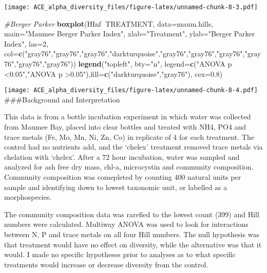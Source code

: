 \documentclass[]{article}
\newenvironment{Shaded}{\begin{snugshade}}{\end{snugshade}}
\newcommand{\KeywordTok}[1]{\textcolor[rgb]{0.13,0.29,0.53}{\textbf{#1}}}
\newcommand{\DataTypeTok}[1]{\textcolor[rgb]{0.13,0.29,0.53}{#1}}
\newcommand{\DecValTok}[1]{\textcolor[rgb]{0.00,0.00,0.81}{#1}}
\newcommand{\FloatTok}[1]{\textcolor[rgb]{0.00,0.00,0.81}{#1}}
\newcommand{\StringTok}[1]{\textcolor[rgb]{0.31,0.60,0.02}{#1}}
\newcommand{\CommentTok}[1]{\textcolor[rgb]{0.56,0.35,0.01}{\textit{#1}}}
\newcommand{\OperatorTok}[1]{\textcolor[rgb]{0.81,0.36,0.00}{\textbf{#1}}}
\newcommand{\NormalTok}[1]{#1}
\begin{document}
\texttt{[image: ACE\_alpha\_diversity\_files/figure-latex/unnamed-chunk-8-3.pdf]}

\begin{Shaded}
\begin{Highlighting}[]
\CommentTok{#Berger Parker}
\KeywordTok{boxplot}\NormalTok{(HInf}\OperatorTok{~}\NormalTok{TREATMENT, }\DataTypeTok{data=}\NormalTok{maum.hills,}
        \DataTypeTok{main=}\StringTok{"Maumee Berger Parker Index"}\NormalTok{,}
        \DataTypeTok{xlab=}\StringTok{"Treatment"}\NormalTok{,}
        \DataTypeTok{ylab=}\StringTok{"Berger Parker Index"}\NormalTok{,}
        \DataTypeTok{las=}\DecValTok{2}\NormalTok{,}
        \DataTypeTok{col=}\KeywordTok{c}\NormalTok{(}\StringTok{"gray76"}\NormalTok{,}\StringTok{"gray76"}\NormalTok{,}\StringTok{"gray76"}\NormalTok{,}\StringTok{"darkturquoise"}\NormalTok{,}\StringTok{"gray76"}\NormalTok{,}\StringTok{"gray76"}\NormalTok{,}\StringTok{"gray76"}\NormalTok{,}\StringTok{"gray76"}\NormalTok{,}\StringTok{"gray76"}\NormalTok{,}\StringTok{"gray76"}\NormalTok{))}
\KeywordTok{legend}\NormalTok{(}\StringTok{"topleft"}\NormalTok{, }\DataTypeTok{bty=}\StringTok{"n"}\NormalTok{, }\DataTypeTok{legend=}\KeywordTok{c}\NormalTok{(}\StringTok{"ANOVA p <0.05"}\NormalTok{,}\StringTok{"ANOVA p >0.05"}\NormalTok{),}\DataTypeTok{fill=}\KeywordTok{c}\NormalTok{(}\StringTok{"darkturquoise"}\NormalTok{,}\StringTok{"gray76"}\NormalTok{), }\DataTypeTok{cex=}\FloatTok{0.8}\NormalTok{)}
\end{Highlighting}
\end{Shaded}

\texttt{[image: ACE\_alpha\_diversity\_files/figure-latex/unnamed-chunk-8-4.pdf]}
\#\#\#Background and Interpretation

This data is from a bottle incubation experiment in which water was
collected from Maumee Bay, placed into clear bottles and treated with
NH4, PO4 and trace metals (Fe, Mo, Mn, Ni, Zn, Co) in replicate of 4 for
each treatment. The control had no nutrients add, and the `chelex'
treatment removed trace metals via chelation with `chelex'. After a 72
hour incubation, water was sampled and analyzed for ash free dry mass,
chl-a, microcystin and community composition. Community composition was
comepleted by counting 400 natural units per sample and identifying down
to lowest taxonomic unit, or labelled as a morphospecies.

The community composition data was rarefied to the lowest count (399)
and Hill numbers were calculated. Multiway ANOVA was used to look for
interactions between N, P and trace metals on all four Hill numbers. The
null hypothesis was that treatment would have no effect on diversity,
while the alternative was that it would. I made no specific hypotheses
prior to analyses as to what specific treatments would increase or
decrease diversity from the control.
\end{document}
